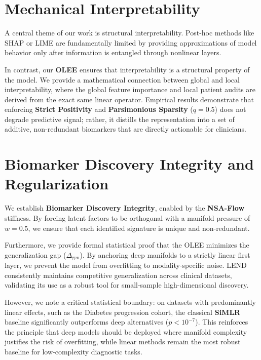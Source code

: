 \documentclass[
  letterpaper,
]{report}
\begin{document}
\section{Mechanical Interpretability}\label{mechanical-interpretability}

A central theme of our work is structural interpretability. Post-hoc
methods like SHAP or LIME are fundamentally limited by providing
approximations of model behavior only after information is entangled
through nonlinear layers.

In contrast, our \textbf{OLEE} ensures that interpretability is a
structural property of the model. We provide a mathematical connection
between global and local interpretability, where the global feature
importance and local patient audits are derived from the exact same
linear operator. Empirical results demonstrate that enforcing
\textbf{Strict Positivity} and \textbf{Parsimonious Sparsity}
(\(q=0.5\)) does not degrade predictive signal; rather, it distills the
representation into a set of additive, non-redundant biomarkers that are
directly actionable for clinicians.

\section{Biomarker Discovery Integrity and
Regularization}\label{biomarker-discovery-integrity-and-regularization}

We establish \textbf{Biomarker Discovery Integrity}, enabled by the
\textbf{NSA-Flow} stiffness. By forcing latent factors to be orthogonal
with a manifold pressure of \(w=0.5\), we ensure that each identified
signature is unique and non-redundant.

Furthermore, we provide formal statistical proof that the OLEE minimizes
the generalization gap (\(\Delta_{\text{gen}}\)). By anchoring deep
manifolds to a strictly linear first layer, we prevent the model from
overfitting to modality-specific noise. LEND consistently maintains
competitive generalization across clinical datasets, validating its use
as a robust tool for small-sample high-dimensional discovery.

However, we note a critical statistical boundary: on datasets with
predominantly linear effects, such as the Diabetes progression cohort,
the classical \textbf{SiMLR} baseline significantly outperforms deep
alternatives (\(p < 10^{-7}\)). This reinforces the principle that deep
models should be deployed where manifold complexity justifies the risk
of overfitting, while linear methods remain the most robust baseline for
low-complexity diagnostic tasks.
\end{document}
